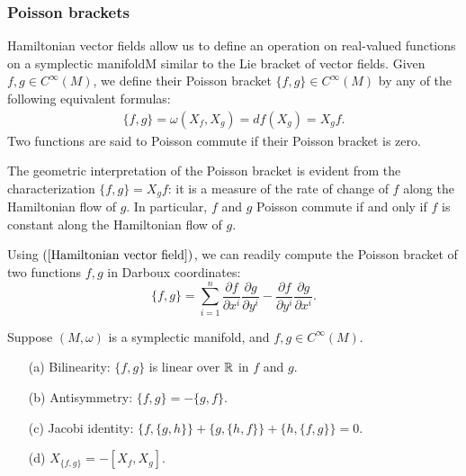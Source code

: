 \subsubsection{Poisson brackets}
Hamiltonian vector fields allow us to define an operation on real-valued functions on a symplectic manifoldM similar to the Lie bracket of vector fields. Given $f,g\in C^\infty(M)$, we define their Poisson bracket $\{f,g\}\in C^\infty(M)$ by any of the following equivalent formulas:
\begin{align}\label{Possion bracket}
\{f,g\}=\omega(X_f,X_g)=df(X_g)=X_gf.
\end{align}
Two functions are said to Poisson commute if their Poisson bracket is zero.\par
The geometric interpretation of the Poisson bracket is evident from the characterization $\{f,g\}=X_gf$: it is a measure of the rate of change of $f$ along the Hamiltonian flow of $g$. In particular, $f$ and $g$ Poisson commute if and only if $f$ is constant along the Hamiltonian flow of $g$.\par
Using $(\ref{Hamiltonian vector field})$, we can readily compute the Poisson bracket of two functions $f,g$ in Darboux coordinates:
\[\{f,g\}=\sum_{i=1}^{n}\frac{\partial f}{\partial x^i}\frac{\partial g}{\partial y^i}-\frac{\partial f}{\partial y^i}\frac{\partial g}{\partial x^i}.\]
\begin{proposition}
Suppose $(M,\omega)$ is a symplectic manifold, and $f,g\in C^\infty(M)$.
\begin{itemize}
\item[(a)] Bilinearity: $\{f,g\}$ is linear over $\mathbb{R}$ in $f$ and $g$.
\item[(b)] Antisymmetry: $\{f,g\}=-\{g,f\}$.
\item[(c)] Jacobi identity: $\{f,\{g,h\}\}+\{g,\{h,f\}\}+\{h,\{f,g\}\}=0$.
\item[(d)] $X_{\{f,g\}}=-[X_f,X_g]$.   
\end{itemize}
\end{proposition}
